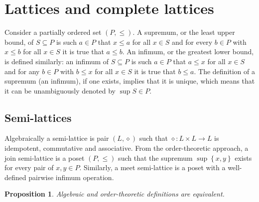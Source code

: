 \documentclass[a4paper]{article}
\newcommand{\obj}[1]{{\left\{ #1 \right \}}}
\newtheorem{prop}{Proposition}
\begin{document}


\section{Lattices and complete lattices} %
\label{sec:lattices_and_complete_lattices}

Consider a partially ordered set $(P, \leq)$. A supremum, or the least upper bound, of $S\subseteq P$ is such $a\in P$ that $x\leq a$ for all $x\in S$ and for every $b\in P$ with $x\leq b$ for all $x\in S$ it is true that $a\leq b$. An infimum, or the greatest lower bound, is defined similarly: an infimum of $S\subseteq P$ is such $a\in P$ that $a\leq x$ for all $x\in S$ and for any $b\in P$ with $b\leq x$ for all $x\in S$ it is true that $b\leq a$. The definition of a supremum (an infimum), if one exists, implies that it is unique, which means that it can be unambiguously denoted by $\sup S\in P$.

\subsection{Semi-lattices} %
\label{sub:semi_lattices}

Algebraically a semi-lattice is pair $(L, \diamond)$ such that $\diamond: L\times L \to L$ is idempotent, commutative and associative. From the order-theoretic approach, a join semi-lattice is a poset $(P, \leq)$ such that the supremum $\sup\obj{x, y}$ exists for every pair of $x, y \in P$. Similarly, a meet semi-lattice is a poset with a well-defined pairwise infimum operation.

\begin{prop} Algebraic and order-theoretic definitions are equivalent.
\end{prop}
\end{document}
